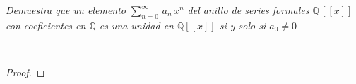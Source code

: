 \documentclass[11pt,letterpaper]{article}
\newcommand{\Q}{\mathbb{Q}}
\begin{document}
\begin{tcolorbox}[
	title = \textcolor{black}{\textcolor{white}{Problema 1}},]
\textit{Demuestra que un elemento $\displaystyle \sum_{n=0}^{\infty}\,a_n\,x^n$ del anillo de series formales $\Q\,[[x]]$
con coeficientes en $\Q$ es una unidad en $\Q[[x]]$ si y solo si $a_0\neq 0$
}
\end{tcolorbox}\,\\
\begin{proof}
    
\end{proof}\,\\
\end{document}

